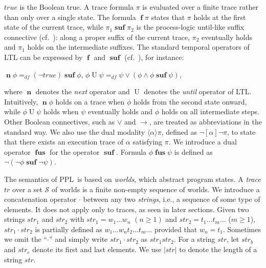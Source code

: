 \documentclass[manuscript,screen]{acmart}
\newcommand{\mcl}[1]{\mathcal{#1}}
\newcommand{\la}[0]{\langle}
\newcommand{\ra}[0]{\rangle}
\newcommand{\dddef}[0]{=_{df}}
\newcommand{\true}[0]{\mathit{true}}
\newcommand{\suf}[0]{\preceq_s}
\newcommand{\psuf}[0]{\prec_s}
\newcommand{\Wd}[0]{\mcl{S}}
\DeclareMathOperator{\ofst}{\mathbf{f}}
\DeclareMathOperator{\osuf}{\mathbf{suf}}
\DeclareMathOperator{\ofus}{\mathbf{fus}}
\newcommand{\str}[0]{str}
\DeclareMathOperator{\nxt}{\mathbf{n}}
\DeclareMathOperator{\unt}{U}
\newcommand{\PPL}[0]{\mbox{PPL}}
\newcommand{\A}[1]{\mbox{ \textbf{#1} }}
\newcommand{\EMO}{\A{EMO}}
\begin{document}
$\true$ is the Boolean true.
A trace formula $\pi$ is evaluated over a finite trace rather than only over a single state.  The formula $\ofst\pi$ states that $\pi$ holds at the first state of the current trace, while $\pi_1\osuf\pi_2$ is the process-logic until-like suffix connective (cf.~\cite{Harel82}): along a proper suffix of the current trace, $\pi_2$ eventually holds and $\pi_1$ holds on the intermediate suffixes.  
The standard temporal operators of LTL can be expressed by $\ofst$ and $\osuf$ (cf.~\cite{Harel82}), for instance: 
\begin{center}
$\nxt\phi \dddef (\neg\true)\osuf\phi$, $\phi\unt\psi \dddef \psi\vee(\phi\wedge\phi\osuf\psi)$,  
\end{center}
where $\nxt$ denotes the \emph{next} operator and $\unt$ denotes the \emph{until} operator of LTL.  Intuitively, $\nxt\phi$ holds on a trace when $\phi$ holds from the second state onward, while $\phi\unt\psi$ holds when $\psi$ eventually holds and $\phi$ holds on all intermediate steps.  
Other Boolean connectives, such as $\vee$ and $\to$, are treated as abbreviations in the standard way.  We also use the dual modality $\la\alpha\ra\pi$, defined as $\neg[\alpha]\neg\pi$, to state that there exists an execution trace of $\alpha$ satisfying $\pi$.
We introduce a dual operator $\ofus$ for the operator $\osuf$. 
Formula $\phi\ofus\psi$ is defined as $\neg(\neg\phi\osuf \neg\psi)$. 

The semantics of \PPL\ is based on \emph{worlds}, which abstract program states.  A \emph{trace} $tr$ over a set $\Wd$ of worlds is a finite non-empty sequence of worlds.  %
We introduce a concatenation operator $\cdot$ between any two \emph{strings}, i.e., a sequence of some type of elements. It does not apply only to traces, as seen in later sections. 
Given two strings $\str_1$ and $\str_2$ with $\str_1 = w_1\ldots w_n$ $(n\ge 1)$ and $\str_2 = t_1\ldots t_m\ldots$ ($m\ge 1$), $\str_1\cdot \str_2$ is partially defined as $w_1\ldots w_nt_2\ldots t_m\ldots$ provided that $w_n = t_1$. 
Sometimes we omit the ``$\cdot$'' and simply write $\str_1\cdot \str_2$ as $\str_1\str_2$. 
For a string $\str$, let $\str_b$ and $\str_e$ denote its first and last elements. 
We use $|\str|$ to denote the length of a string $\str$. 
\end{document}
